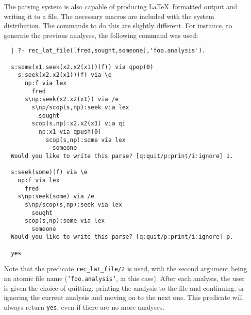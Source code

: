 
The parsing system is also capable of producing \LaTeX\ formatted
output and writing it to a file.  The necessary macros are included
with the system distribution.
The commands to do this are slightly different.  For
instance, to generate the previous analyses, the following command was used: 
%
\begin{verbatim}
  | ?- rec_lat_file([fred,sought,someone],'foo.analysis').
  
  s:some(x1.seek(x2.x2(x1))(f)) via qpop(0)
    s:seek(x2.x2(x1))(f) via \e
      np:f via lex
        fred
      s\np:seek(x2.x2(x1)) via /e
        s\np/scop(s,np):seek via lex
          sought
        scop(s,np):x2.x2(x1) via qi
          np:x1 via qpush(0)
            scop(s,np):some via lex
              someone
  Would you like to write this parse? [q:quit/p:print/i:ignore] i.
  
  s:seek(some)(f) via \e
    np:f via lex
      fred
    s\np:seek(some) via /e
      s\np/scop(s,np):seek via lex
        sought
      scop(s,np):some via lex
        someone
  Would you like to write this parse? [q:quit/p:print/i:ignore] p.
  
  yes
\end{verbatim}  
%
Note that the predicate {\tt rec\_lat\_file/2} is used, with the second
argument being an atomic file name ({\tt 'foo.analysis'}, in this
case).  After each analysis, the user is given the choice of quitting,
printing the analysis to the file and continuing, or ignoring the
current analysis and moving on to the next one.  This predicate will
always return {\tt yes}, even if there are no more analyses.

